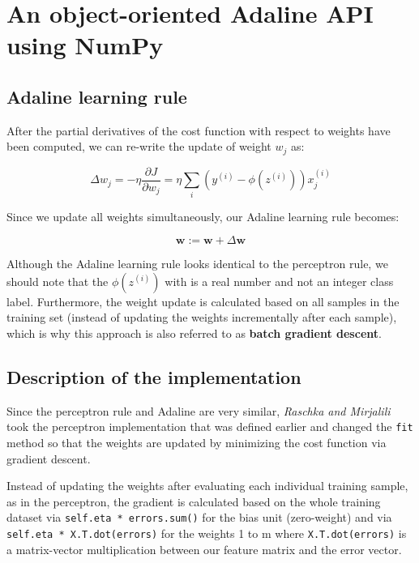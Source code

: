 \documentclass[11pt]{article}
\newcommand{\pa}[1]{\partial{#1}}
\begin{document}
    \section{An object-oriented Adaline API using NumPy} \label{sec:ada_api}

    \subsection{Adaline learning rule} \label{subsec:ada_learn_rule}

    After the partial derivatives of the cost function with respect to weights have been computed, we can re-write the update of weight $w_j$ as:

    \begin{equation}
        \label{eq:ada_weight_update}
        \Delta w_j = - \eta \frac{ \pa{J} } { \pa{w_j} } =
        \eta \sum \limits_i \left( y^{(i)} - \phi \left( z^{(i)} \right) \right) x_j^{(i)}
    \end{equation}

    Since we update all weights simultaneously, our Adaline learning rule becomes:

    \begin{equation}
        \label{eq:ada_learn_rule}
        \boldsymbol{w} := \boldsymbol{w} + \Delta \boldsymbol{w}
    \end{equation}

    Although the Adaline learning rule looks identical to the perceptron rule, we should note that the $\phi \left( z^{(i)} \right)$ with is a real number and not an integer class label.
    Furthermore, the weight update is calculated based on all samples in the training set (instead of updating the weights incrementally after each sample), which is why this approach is also referred to as \textbf{batch gradient descent}.

    \subsection{Description of the implementation} \label{subsec:ada_impl}

    Since the perceptron rule and Adaline are very similar, \textit{Raschka and Mirjalili}\cite{RaschkaMirjalili2017} took the perceptron implementation that was defined earlier and changed the \texttt{fit} method so that the weights are updated by minimizing the cost function via gradient descent.

    Instead of updating the weights after evaluating each individual training sample, as in the perceptron, the gradient is calculated based on the whole training dataset via \texttt{self.eta * errors.sum()} for the bias unit (zero-weight) and via \texttt{self.eta * X.T.dot(errors)} for the weights 1 to m where \texttt{X.T.dot(errors)} is a matrix-vector multiplication between our feature matrix and the error vector.
\end{document}

